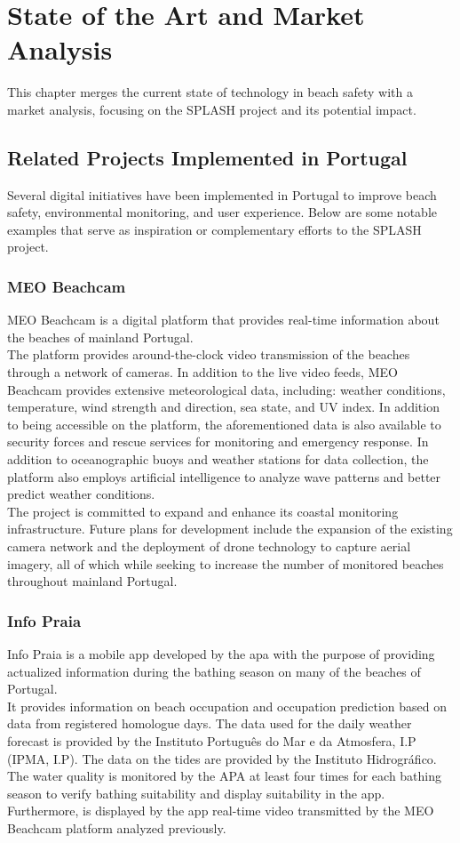 \chapter{State of the Art and Market Analysis}
\label{chapter:sota}

This chapter merges the current state of technology in beach safety with a market analysis, focusing on the SPLASH project and its potential impact.

\section{Related Projects Implemented in Portugal}
Several digital initiatives have been implemented in Portugal to improve beach safety, environmental monitoring, and user experience. Below are some notable examples that serve as inspiration or complementary efforts to the SPLASH project.
\subsection{MEO Beachcam}
MEO Beachcam is a digital platform that provides real-time information about the beaches of mainland Portugal.
\\
\indent The platform provides around-the-clock video transmission of the beaches through a network of cameras. In addition to the live video feeds, MEO Beachcam provides extensive meteorological data, including: weather conditions, temperature, wind strength and direction, sea state, and UV index. In addition to being accessible on the platform, the aforementioned data is also available to security forces and rescue services for monitoring and emergency response. In addition to oceanographic buoys and weather stations for data collection, the platform also employs artificial intelligence to analyze wave patterns and better predict weather conditions. 
\\
\indent The project is committed to expand and enhance its coastal monitoring infrastructure. Future plans for development include the expansion of the existing camera network and the deployment of drone technology to capture aerial imagery, all of which while seeking to increase the number of monitored beaches throughout mainland Portugal.

\subsection{Info Praia}
Info Praia is a mobile app developed by the \ac{apa}  with the purpose of providing actualized information during the bathing season on many of the beaches of Portugal\citep{infopraia1}.
\\
\indent It provides information on beach occupation and occupation prediction based on data from registered homologue days. The data used for the daily weather forecast is provided by the Instituto Português do Mar e da Atmosfera, I.P (IPMA, I.P). The data on the tides are provided by the Instituto Hidrográfico\citep{infopraia2}. The water quality is monitored by the APA at least four times for each bathing season to verify bathing suitability and display suitability in the app. Furthermore, is displayed by the app real-time video transmitted by the MEO Beachcam platform analyzed previously.
